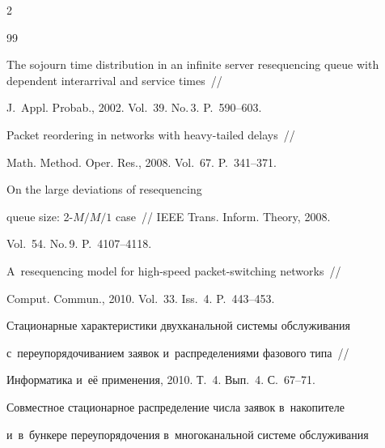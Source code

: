 \begin{multicols}{2}
{{\begin{thebibliography}{99}


The sojourn time distribution in an infinite server resequencing queue with dependent interarrival and service times~//


J.~Appl. Probab., 2002. Vol.~39. No.\,3. P.~590--603.












Packet reordering in networks with heavy-tailed delays~//


Math. Method. Oper. Res., 2008. Vol.~67. P.~341--371.









On the large deviations of resequencing


queue size: 2-$M/M/1$ case~// IEEE Trans. Inform. Theory, 2008.


Vol.~54. No.\,9. P.~4107--4118.









A~resequencing model for high-speed packet-switching networks~//


Comput. Commun., 2010. Vol.~33. Iss.~4. P.~443--453.









Стационарные характеристики двухканальной системы обслуживания 


с~переупорядочиванием заявок и~распределениями фазового типа~// 


Информатика и~её применения, 2010. Т.~4. Вып.~4. С.~67--71.












Совместное стационарное распределение числа заявок в~накопителе 


и~в~бункере переупорядочения в~многоканальной сис\-те\-ме обслуживания 



\end{thebibliography}}}
\end{multicols}
